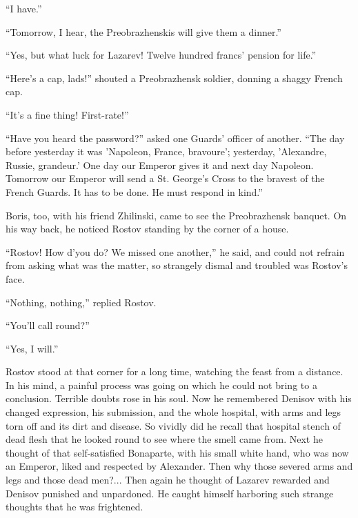 ``I have.''

``Tomorrow, I hear, the Preobrazhenskis will give them a
dinner.''

``Yes, but what luck for Lazarev! Twelve hundred francs' pension
for life.''

``Here's a cap, lads!'' shouted a Preobrazhensk soldier, donning
a shaggy French cap.

``It's a fine thing! First-rate!''

``Have you heard the password?'' asked one Guards' officer of
another.  ``The day before yesterday it was 'Napoleon, France,
bravoure'; yesterday, 'Alexandre, Russie, grandeur.' One day our
Emperor gives it and next day Napoleon. Tomorrow our Emperor will
send a St. George's Cross to the bravest of the French Guards. It
has to be done. He must respond in kind.''

Boris, too, with his friend Zhilinski, came to see the
Preobrazhensk banquet. On his way back, he noticed Rostov
standing by the corner of a house.

``Rostov! How d'you do? We missed one another,'' he said, and
could not refrain from asking what was the matter, so strangely
dismal and troubled was Rostov's face.

``Nothing, nothing,'' replied Rostov.

``You'll call round?''

``Yes, I will.''

Rostov stood at that corner for a long time, watching the feast
from a distance. In his mind, a painful process was going on
which he could not bring to a conclusion. Terrible doubts rose in
his soul. Now he remembered Denisov with his changed expression,
his submission, and the whole hospital, with arms and legs torn
off and its dirt and disease. So vividly did he recall that
hospital stench of dead flesh that he looked round to see where
the smell came from. Next he thought of that self-satisfied
Bonaparte, with his small white hand, who was now an Emperor,
liked and respected by Alexander. Then why those severed arms and
legs and those dead men?... Then again he thought of Lazarev
rewarded and Denisov punished and unpardoned. He caught himself
harboring such strange thoughts that he was frightened.

